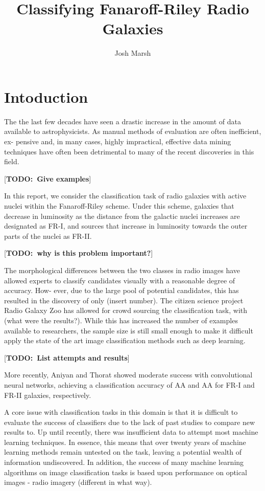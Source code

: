 \documentclass{article}
\newcommand{\todo}[1]{ {\color{red}[{\bf TODO:~{#1}}]} }
\begin{document}

\title{Classifying Fanaroff-Riley Radio Galaxies}
\author{Josh Marsh}

\maketitle

\section{\label{sec:level1}Intoduction}

The the last few decades have seen a drastic increase
in the amount of data available to astrophysicists. As
manual methods of evaluation are often inefficient, ex-
pensive and, in many cases, highly impractical, effective
data mining techniques have often been detrimental to
many of the recent discoveries in this field.

\todo{Give examples}

In this report, we consider the classification task of radio galaxies with active nuclei within the Fanaroff-Riley
scheme. Under this scheme, galaxies that decrease in luminosity as the distance from the galactic nuclei increases are designated as FR-I, and sources that increase in luminosity towards the outer parts of the nuclei as FR-II.

\todo{why is this problem important?}

The morphological differences between the two classes
in radio images have allowed experts to classify candidates visually with a reasonable degree of accuracy. How-
ever, due to the large pool of potential candidates, this
has resulted in the discovery of only (insert number). The
citizen science project Radio Galaxy Zoo has allowed for
crowd sourcing the classification task, with (what were
the results?). While this has increased the number of
examples available to researchers, the sample size is still
small enough to make it difficult apply the state of the
art image classification methods such as deep learning.

\todo{List attempts and results}

More recently, Aniyan and Thorat showed moderate
success with convolutional neural networks, achieving a
classification accuracy of AA and AA for FR-I and FR-II
galaxies, respectively.

A core issue with classification tasks in this domain is
that it is difficult to evaluate the success of classifiers due to the lack of past studies to compare new results to. Up until recently, there was insufficient data to attempt most machine learning techniques. In essence, this means that over twenty years of machine learning methods remain
untested on the task, leaving a potential wealth of information undiscovered. In addition, the success of many
machine learning algorithms on image classification tasks
is based upon performance on optical images - radio imagery (different in what way).
\end{document}
